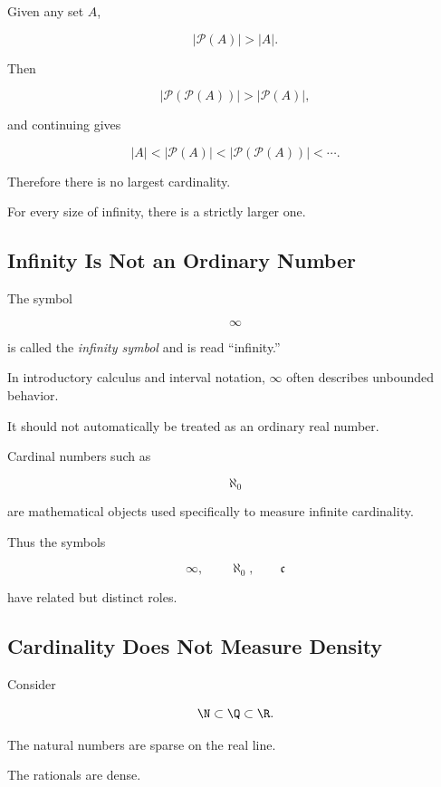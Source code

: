 Given any set \(A\),

\[ |\mathcal P(A)|>|A|. \]

Then

\[ |\mathcal P(\mathcal P(A))|>|\mathcal P(A)|, \]

and continuing gives

\[ |A|
<
|\mathcal P(A)|
<
|\mathcal P(\mathcal P(A))|
<
\cdots. \]

Therefore there is no largest cardinality.

For every size of infinity, there is a strictly larger one.

\subsection{Infinity Is Not an Ordinary Number}
\label{subsec:infinity-not-ordinary-number}

The symbol

\[ \infty \]

is called the \emph{infinity symbol} and is read ``infinity.''

In introductory calculus and interval notation, \(\infty\) often describes
unbounded behavior.

It should not automatically be treated as an ordinary real number.

Cardinal numbers such as

\[ \aleph_0 \]

are mathematical objects used specifically to measure infinite cardinality.

Thus the symbols

\[ \infty,\qquad \aleph_0,\qquad \mathfrak c \]

have related but distinct roles.

\subsection{Cardinality Does Not Measure Density}
\label{subsec:cardinality-not-density}

Consider

\[ \N\subset\Q\subset\R. \]

The natural numbers are sparse on the real line.

The rationals are dense.

